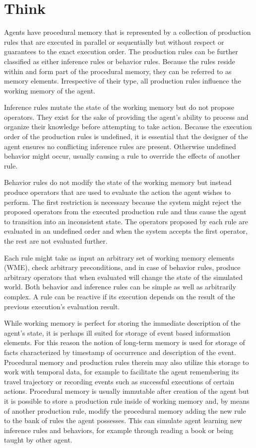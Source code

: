 \section{Think}

Agents have procedural memory that is represented by a collection of production rules that are executed in parallel or sequentially but without respect or guarantees to the exact execution order.
The production rules can be further classified as either inference rules or behavior rules.
Because the rules reside within and form part of the procedural memory, they can be referred to as memory elements.
Irrespective of their type, all production rules influence the working memory of the agent.

Inference rules mutate the state of the working memory but do not propose operators.
They exist for the sake of providing the agent's ability to process and organize their knowledge before attempting to take action.
Because the execution order of the production rules is undefined, it is essential that the designer of the agent ensures no conflicting inference rules are present.
Otherwise undefined behavior might occur, usually causing a rule to override the effects of another rule.

Behavior rules do not modify the state of the working memory but instead produce operators that are used to evaluate the action the agent wishes to perform.
The first restriction is necessary because the system might reject the proposed operators from the executed production rule and thus cause the agent to transition into an inconsistent state.
The operators proposed by each rule are evaluated in an undefined order and when the system accepts the first operator, the rest are not evaluated further.

Each rule might take as input an arbitrary set of working memory elements (WME), check arbitrary preconditions, and in case of behavior rules, produce arbitrary operators that when evaluated will change the state of the simulated world.
Both behavior and inference rules can be simple as well as arbitrarily complex.
A rule can be reactive if its execution depends on the result of the previous execution's evaluation result.

While working memory is perfect for storing the immediate description of the agent's state, it is perhaps ill suited for storage of event based information elements.
For this reason the notion of long-term memory is used for storage of facts characterized by timestamp of occurrence and description of the event.
Procedural memory and production rules therein may also utilize this storage to work with temporal data, for example to facilitate the agent remembering its travel trajectory or recording events such as successful executions of certain actions.
Procedural memory is usually immutable after creation of the agent but it is possible to store a production rule inside of working memory and, by means of another production rule, modify the procedural memory adding the new rule to the bank of rules the agent possesses.
This can simulate agent learning new inference rules and behaviors, for example through reading a book or being taught by other agent.

